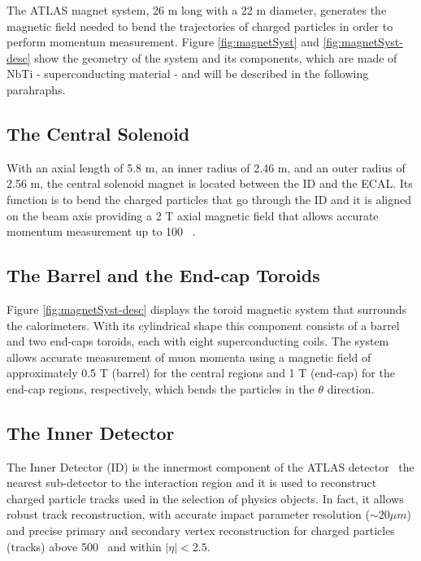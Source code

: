 			\noindent The ATLAS magnet system, 26 m long with a 22 m diameter, generates the magnetic field needed to bend the trajectories of charged particles in order to perform momentum measurement. Figure \ref{fig:magnetSyst} and \ref{fig:magnetSyst-desc} show the geometry of the system and its components, which are made of NbTi - superconducting material - and will be described in the following parahraphs. 



			\subsection*{The Central Solenoid}

				With an axial length of 5.8 m, an inner radius of 2.46 m, and an outer radius of 2.56 m, the central solenoid magnet is located between the ID and the ECAL. Its function is to bend the charged particles that go through the ID and it is aligned on the beam axis providing a 2 T axial magnetic field that allows accurate momentum measurement up to 100 \GeV\ \cite{YAMAMOTO200853}.

			\subsection*{The Barrel and the End-cap Toroids}

				Figure \ref{fig:magnetSyst-desc} displays the toroid magnetic system that surrounds the calorimeters. With its cylindrical shape this component consists of a barrel and two end-caps toroids, each with eight superconducting coils. The system allows accurate measurement of muon momenta using a magnetic field of approximately 0.5 T (barrel) for the central regions and 1 T (end-cap) for the end-cap regions, respectively, which bends the particles in the $\theta$ direction.

				
		\subsection{The Inner Detector}
		\label{sec:ID}

			The Inner Detector (ID) \cite{ATLASInDet} is the innermost component of the ATLAS detector \ie\ the nearest sub-detector to the interaction region and it is used to reconstruct charged particle tracks used in the selection of physics objects. In fact, it allows robust track reconstruction, with accurate impact parameter resolution ($\sim 20 \mu m$) and precise primary and secondary vertex reconstruction for charged particles (tracks) above 500 \MeV\ and within $\displaystyle|\eta| < 2.5$.


